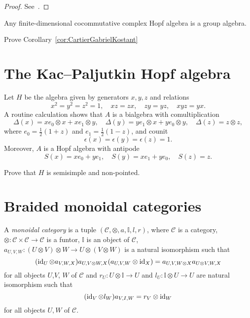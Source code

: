 \documentclass[12pt]{amsproc}
\begin{document}
\begin{proof}
    See~\cite[Theorem 4.5.1]{zbMATH07372929}. 
\end{proof}


\begin{corollary}
\label{cor:CartierGabrielKostant}
    Any finite-dimensional cocommutative complex Hopf algebra
    is a group algebra. 
\end{corollary}

\begin{exercise}
    Prove Corollary~\ref{cor:CartierGabrielKostant}
\end{exercise}

\section{The Kac--Paljutkin Hopf algebra}

Let $H$ be the algebra given by generators 
$x,y,z$ and relations 
\[
x^2=y^2=z^2=1,\quad 
xz=zx,\quad 
zy=yz,\quad 
xyz=yx.
\]
A routine calculation shows that $A$ is a bialgebra 
with 
comultiplication 
\[
\Delta(x)=xe_0\otimes x+xe_1\otimes y,
\quad 
\Delta(y)=ye_1\otimes x+ye_0\otimes y,
\quad 
\Delta(z)=z\otimes z,
\]
where $e_0=\frac12(1+z)$ and $e_1=\frac12(1-z)$, and 
counit 
\[
\epsilon(x)=\epsilon(y)=\epsilon(z)=1.
\]
Moreover, $A$ is a Hopf algebra 
with antipode 
\[
S(x)=xe_0+ye_1,\quad 
S(y)=xe_1+ye_0,\quad 
S(z)=z.
\]

\begin{exercise}
\label{xca: KacPaljutkin}
    Prove that $H$
    is semisimple and non-pointed. 
\end{exercise}


\section{Braided monoidal categories}
\begin{definition}
A \emph{monoidal category} is a tuple
$(\mathcal{C},\otimes,a,\mathbb{I},l,r)$, where $\mathcal{C}$ is a category,
$\otimes:\mathcal{C}\times\mathcal{C}\to\mathcal{C}$ is a funtor, $\mathbb{I}$
is an object of $\mathcal{C}$, $a_{U,V,W}:(U\otimes V)\otimes W\to
U\otimes(V\otimes W)$ is a natural isomorphism such that 
\begin{equation}
(\operatorname{id}_{U}\otimes a_{V,W,X})a_{U,V\otimes W,X}(a_{U,V,W}\otimes\operatorname{id}_{X})=a_{U,V,W\otimes X}a_{U\otimes V,W,X}\label{eq:pentagon}
\end{equation}
for all objects $U$,$V$, $W$ of $\mathcal{C}$ and $r_{U}:U\otimes\mathbb{I}\to U$
and $l_{U}:\mathbb{I}\otimes U\to U$ are natural isomorphism such
that 
\begin{equation}
(\operatorname{id}_{V}\otimes l_{W})a_{V,I,W}=r_{V}\otimes\operatorname{id}_{W}\label{eq:triangles}
\end{equation}
for all objects $U,W$ of $\mathcal{C}$.
\end{definition}
\end{document}
